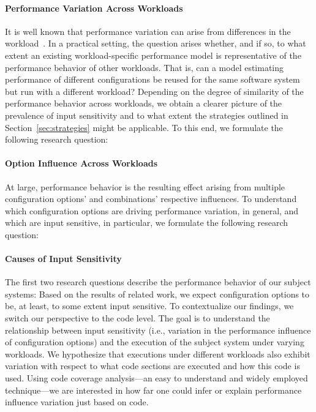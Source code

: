 \paragraph{Performance Variation Across Workloads}
It is well known that performance variation can arise from differences in the workload~\cite{benchmarking_book}. In a practical setting, the question arises whether, and if so, to what extent an existing workload-specific performance model is representative of the performance behavior of other workloads. 
That is, can a model estimating performance of different configurations be reused for the same software system but run with a different workload? Depending on the degree of similarity of the performance behavior across workloads, we obtain a clearer picture of the prevalence of input sensitivity and to what extent the strategies outlined in  Section~\ref{sec:strategies} might be applicable.
To this end, we formulate the following research question: 

\paragraph{Option Influence Across Workloads}
At large, performance behavior is the resulting effect arising from multiple configuration options’ and combinations’ respective influences. To understand which configuration options are driving performance variation, in general, and which are input sensitive, in particular, we formulate the following research question:

\paragraph{Causes of Input Sensitivity}
The first two research questions describe the performance behavior of our subject systems: Based on the results of related work, we expect configuration options to be, at least, to some extent input sensitive. To contextualize our findings, we switch our perspective to the code level. The goal is to understand the relationship between input sensitivity (i.e., variation in the performance influence of configuration options) and the execution of the subject system under varying workloads. We hypothesize that executions under different workloads also exhibit variation with respect to what code sections are executed and how this code is used. Using code coverage analysis---an easy to understand and widely employed technique---we are interested in how far one could infer or explain performance influence variation just based on code. 

